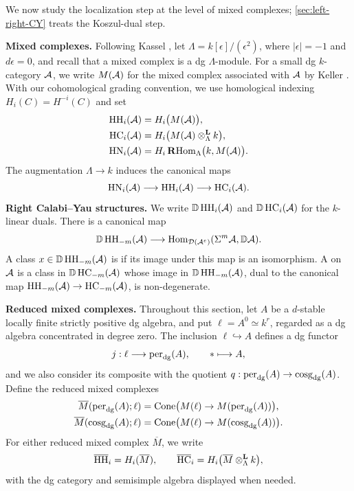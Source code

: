 \documentclass[11pt,a4paper,dvipsnames,x11names]{amsart}
\begin{document}
We now study the localization step at the level of mixed complexes; \cref{sec:left-right-CY} treats the Koszul-dual step.

\noindent\textbf{Mixed complexes.}
Following Kassel \cite{Kassel87}, let $\Lambda=k[\epsilon]/(\epsilon^2)$, where $|\epsilon|=-1$ and $d\epsilon=0$, and recall that a mixed complex is a dg $\Lambda$-module. For a small dg $k$-category $\mathcal A$, we write $M(\mathcal A)$ for the mixed complex associated with $\mathcal A$ by Keller \cite{Keller99}. With our cohomological grading convention, we use homological indexing $H_i(C)=H^{-i}(C)$ and set
\[
\begin{aligned}
\operatorname{HH}_i(\mathcal A)&=H_i\bigl(M(\mathcal A)\bigr),\\
\operatorname{HC}_i(\mathcal A)&=H_i\bigl(M(\mathcal A)\otimes_{\Lambda}^{\mathbf L}k\bigr),\\
\operatorname{HN}_i(\mathcal A)&=H_i\operatorname{\mathbf{R}Hom}_{\Lambda}\bigl(k,M(\mathcal A)\bigr).
\end{aligned}
\]
The augmentation $\Lambda\to k$ induces the canonical maps
\[
\operatorname{HN}_i(\mathcal A)\longrightarrow\operatorname{HH}_i(\mathcal A)\longrightarrow\operatorname{HC}_i(\mathcal A).
\]
\medskip\noindent\textbf{Right Calabi--Yau structures.}
We write $\mathbb D\operatorname{HH}_i(\mathcal A)$ and $\mathbb D\operatorname{HC}_i(\mathcal A)$ for the $k$-linear duals. There is a canonical map
\[
\mathbb D\operatorname{HH}_{-m}(\mathcal A)\longrightarrow
\operatorname{Hom}_{\mathcal D(\mathcal A^e)}(\Sigma^m\mathcal A,\mathbb D\mathcal A).
\]
A class $x\in\mathbb D\operatorname{HH}_{-m}(\mathcal A)$ is  if its image under this map is an isomorphism. A  on $\mathcal A$ is a class in $\mathbb D\operatorname{HC}_{-m}(\mathcal A)$ whose image in $\mathbb D\operatorname{HH}_{-m}(\mathcal A)$, dual to the canonical map $\operatorname{HH}_{-m}(\mathcal A)\to\operatorname{HC}_{-m}(\mathcal A)$, is non-degenerate.

\medskip\noindent\textbf{Reduced mixed complexes.}
Throughout this section, let $A$ be a $d$-stable locally finite strictly positive dg algebra, and put $\ell=A^0\simeq k^r$, regarded as a dg algebra concentrated in degree zero. The inclusion $\ell\hookrightarrow A$ defines a dg functor
\[
j:\ell\longrightarrow\operatorname{per}_{\mathrm{dg}}(A),\qquad *\longmapsto A,
\]
and we also consider its composite with the quotient $q:\operatorname{per}_{\mathrm{dg}}(A)\to\operatorname{cosg}_{\mathrm{dg}}(A)$. Define the reduced mixed complexes
\[
\begin{aligned}
\overline M(\operatorname{per}_{\mathrm{dg}}(A);\ell)
&=\operatorname{Cone}\bigl(M(\ell)\to M(\operatorname{per}_{\mathrm{dg}}(A))\bigr),\\
\overline M(\operatorname{cosg}_{\mathrm{dg}}(A);\ell)
&=\operatorname{Cone}\bigl(M(\ell)\to M(\operatorname{cosg}_{\mathrm{dg}}(A))\bigr).
\end{aligned}
\]
For either reduced mixed complex $\overline M$, we write
\[
\overline{\operatorname{HH}}_i=H_i(\overline M),
\qquad
\overline{\operatorname{HC}}_i=H_i\bigl(\overline M\otimes_{\Lambda}^{\mathbf L}k\bigr),
\]
with the dg category and semisimple algebra displayed when needed.
\end{document}
